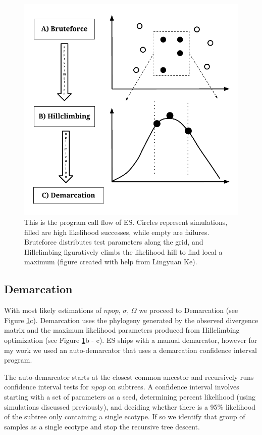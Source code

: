 \begin{figure}[h!]
 \centering
 \includegraphics[scale=0.75]{images/ESFlow-CH2.pdf}
 \caption[Ecotype Simulation program flow diagram.]{This is the program call flow of ES. Circles represent simulations, filled are high likelihood successes, while empty are failures. Bruteforce distributes test parameters along the grid, and Hillclimbing figuratively climbs the likelihood hill to find local a maximum (figure created with help from Lingyuan Ke). }
 \label{fig:Flow}
\end{figure}

\subsection*{Demarcation}
With most likely estimations of $npop$, $\sigma$, $\Omega$ we proceed to Demarcation (see Figure \ref{fig:Flow}c).
Demarcation uses the phylogeny generated by the observed divergence matrix and the maximum likelihood parameters produced from Hillclimbing optimization (see Figure \ref{fig:Flow}b - c).
ES ships with a manual demarcator, however for my work we used an auto-demarcator that uses a demarcation confidence interval program.

The auto-demarcator starts at the closest common ancestor and recursively runs confidence interval tests for $npop$ on subtrees.
A confidence interval involves starting with a set of parameters as a seed, determining percent likelihood (using simulations discussed previously), and deciding whether there is a 95\% likelihood of the subtree only containing a single ecotype.
If so we identify that group of samples as a single ecotype and stop the recursive tree descent.

